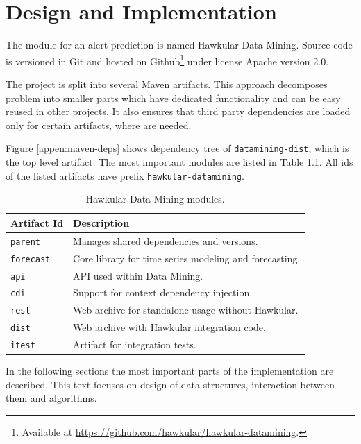 \chapter{Design and Implementation} \label{chap:design-im[pl}
The module for an alert prediction is named Hawkular Data Mining. Source code is versioned in Git and
hosted on Github\footnote{Available at \url{https://github.com/hawkular/hawkular-datamining}.} under
license Apache version 2.0.

The project is split into several Maven artifacts. This approach decomposes problem into smaller parts
which have dedicated functionality and can be easy reused in other projects. It also ensures that
third party dependencies are loaded only for certain artifacts, where are needed.

Figure \ref{appen:maven-deps} shows dependency tree of \texttt{datamining-dist}, which is the top level artifact.
The most important modules are listed in Table \ref{tab:datamining-modules}. All ids of the listed artifacts have prefix
\texttt{hawkular-datamining}.

\begin{table}[h]
    \begin{center}
        \begin{tabular}{l|l}
            \textbf{Artifact Id} & \textbf{Description} \\ \hline \hline
            \texttt{parent} & Manages shared dependencies and versions. \\
            \texttt{forecast} & Core library for time series modeling and forecasting. \\
            \texttt{api} & API used within Data Mining. \\
            \texttt{cdi} & Support for context dependency injection. \\
            \texttt{rest} & Web archive for standalone usage without Hawkular. \\
            \texttt{dist} & Web archive with Hawkular integration code. \\
            \texttt{itest} & Artifact for integration tests.
        \end{tabular}
        \caption{Hawkular Data Mining modules.}
        \label{tab:datamining-modules}
    \end{center}
\end{table}

In the following sections the most important parts of the implementation are described. This text focuses on
design of data structures, interaction between them and algorithms.

